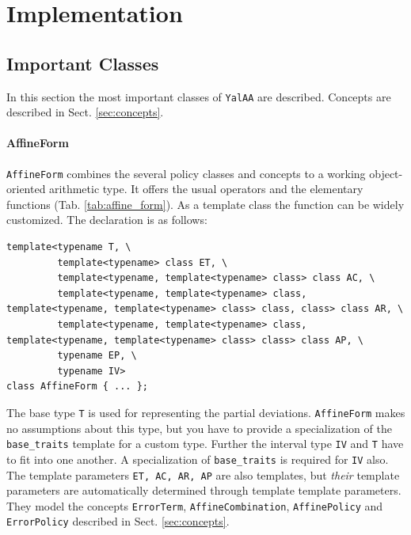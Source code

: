 \documentclass[a4]{scrartcl}
\newcommand{\yalaa}{\texttt{YalAA}\xspace}
\begin{document}
\section{Implementation}
\label{sec:implementation}

\subsection{Important Classes}
\label{sec:non-concept-classes}
In this section the most important classes of \yalaa are described. Concepts
are described in Sect. \ref{sec:concepts}.

\paragraph{AffineForm}

\texttt{AffineForm} combines the several policy classes and concepts to a
working object-oriented arithmetic type. It offers the usual operators and the
elementary functions (Tab. \ref{tab:affine_form}). As a template class the
function can be widely customized. The declaration is as follows:
\begin{tiny}
\begin{verbatim}
template<typename T, \
         template<typename> class ET, \
         template<typename, template<typename> class> class AC, \
         template<typename, template<typename> class, template<typename, template<typename> class> class, class> class AR, \
         template<typename, template<typename> class, template<typename, template<typename> class> class> class AP, \
         typename EP, \
         typename IV>
class AffineForm { ... };
\end{verbatim}
\end{tiny}
The base type \texttt{T} is used for representing the
partial deviations. \texttt{AffineForm} makes no assumptions about this type,
but you have to provide a specialization of the \texttt{base\_traits} template
for a custom type. Further the interval type \texttt{IV} and \texttt{T} have
to fit into one another. A specialization of \texttt{base\_traits} is required for
\texttt{IV} also. The template parameters \texttt{ET, AC, AR, AP} are also templates, but
\emph{their} template parameters are automatically determined through template
template parameters. They model the concepts \texttt{ErrorTerm},
\texttt{AffineCombination}, \texttt{AffinePolicy} and \texttt{ErrorPolicy}
described in Sect. \ref{sec:concepts}.
\end{document}
